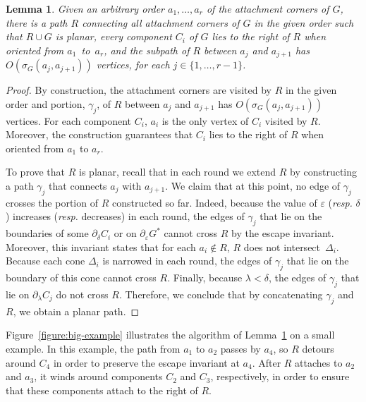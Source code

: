 \documentclass[11pt]{patmorin}
\newtheorem{lemma}[theorem]{Lemma}
\begin{document}
\begin{lemma}\label{lemma:Path for connected augmentations}
Given an arbitrary order $a_1, \ldots, a_r$ of the attachment corners of $G$, there is a path $R$ connecting all attachment corners of $G$ in the given order such that $R\cup G$ is planar, every component $C_i$ of $G$ lies to the right of $R$ when oriented from $a_1$~to~$a_r$, and the subpath of $R$ between $a_j$ and $a_{j+1}$ has $O(\sigma_G(a_j, a_{j+1}))$ vertices, for each $j\in \{1,\dots,r-1\}$.
\end{lemma}
\begin{proof}
By construction, the attachment corners are visited by $R$ in the given order and portion, $\gamma_j$, of $R$ between $a_{j}$ and $a_{j+1}$ has $O(\sigma_G(a_j,a_{j+1}))$ vertices. For each component $C_i$, $a_i$ is the only vertex of $C_i$ visited by $R$. Moreover, the construction guarantees that $C_i$ lies to the right of $R$ when oriented from $a_1$ to $a_r$.

To prove that $R$ is planar, recall that in each round we extend $R$ by constructing  a path $\gamma_j$ that connects $a_j$ with $a_{j+1}$. We claim that at this point, no edge of $\gamma_j$ crosses the portion of $R$ constructed so far.
Indeed, because the value of $\varepsilon$ (\emph{resp.} $\delta$) increases (\emph{resp.} decreases) in each round, the edges of $\gamma_j$ that lie on the boundaries of some $\partial_\delta C_i$ or on $\partial_\varepsilon G^*$ cannot cross $R$ by the escape invariant.
Moreover, this invariant states that for each $a_i\notin R$, $R$ does not intersect~$\Delta_i$.
Because each cone $\Delta_i$ is narrowed in each round, the edges of $\gamma_j$ that lie on the boundary of this cone cannot cross $R$. Finally, because $\lambda < \delta$, the edges of $\gamma_j$ that lie on $\partial_\lambda C_j$ do not cross $R$. Therefore, we conclude that by concatenating $\gamma_j$ and $R$, we obtain a planar path.
\end{proof}

Figure~\ref{figure:big-example} illustrates the algorithm of Lemma~\ref{lemma:Path for connected augmentations} on a small example.  In this example, the path from $a_1$ to $a_2$ passes by $a_4$, so $R$ detours around $C_4$ in order to preserve the escape invariant at $a_4$.  After $R$ attaches to $a_2$ and $a_3$, it winds around components $C_2$ and $C_3$, respectively, in order to ensure that these components attach to the right of $R$.
\end{document}
